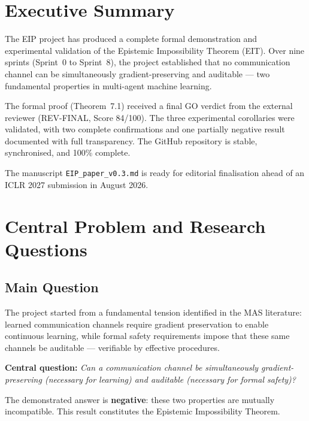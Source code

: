\documentclass[11pt,a4paper]{article}
\theoremstyle{plain}
\begin{document}
\section{Executive Summary}

The EIP project has produced a complete formal demonstration and experimental
validation of the Epistemic Impossibility Theorem (EIT). Over nine sprints
(Sprint~0 to Sprint~8), the project established that no communication channel can
be simultaneously gradient-preserving and auditable --- two fundamental properties
in multi-agent machine learning.

The formal proof (Theorem~7.1) received a final GO verdict from the external
reviewer (REV-FINAL, Score 84/100). The three experimental corollaries were
validated, with two complete confirmations and one partially negative result
documented with full transparency. The GitHub repository is stable, synchronised,
and 100\% complete.

The manuscript \texttt{EIP\_paper\_v0.3.md} is ready for editorial finalisation
ahead of an ICLR 2027 submission in August 2026.

\section{Central Problem and Research Questions}

\subsection{Main Question}

The project started from a fundamental tension identified in the MAS literature:
learned communication channels require gradient preservation to enable continuous
learning, while formal safety requirements impose that these same channels be
auditable --- verifiable by effective procedures.

\begin{keyresult}
\textbf{Central question:} \textit{Can a communication channel be simultaneously
gradient-preserving (necessary for learning) and auditable (necessary for formal
safety)?}

The demonstrated answer is \textbf{negative}: these two properties are mutually
incompatible. This result constitutes the Epistemic Impossibility Theorem.
\end{keyresult}
\end{document}
